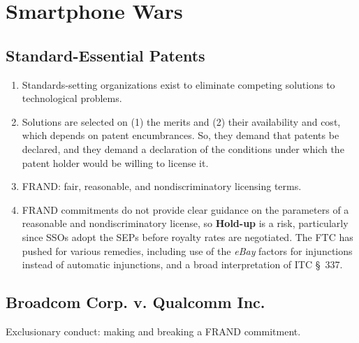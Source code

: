 \section{Smartphone Wars}

\subsection{Standard-Essential Patents}

\begin{enumerate}
    \item Standards-setting organizations exist to eliminate competing 
    solutions to technological problems.
    \item Solutions are selected on (1) the merits and (2) their availability 
    and cost, which depends on patent encumbrances. So, they demand that 
    patents be declared, and they demand a declaration of the conditions under 
    which the patent holder would be willing to license it.
    \item FRAND: fair, reasonable, and nondiscriminatory licensing terms.
    \item FRAND commitments do not provide clear guidance on the parameters of 
    a reasonable and nondiscriminatory license, so \textbf{Hold-up} is a risk, 
    particularly since SSOs adopt the SEPs before royalty rates are 
    negotiated. The FTC has pushed for various remedies, including use of the 
    \emph{eBay} factors for injunctions instead of automatic injunctions, and 
    a broad interpretation of ITC \S\ 337.
\end{enumerate}

\subsection{Broadcom Corp. v. Qualcomm Inc.}

Exclusionary conduct: making and breaking a FRAND commitment.


